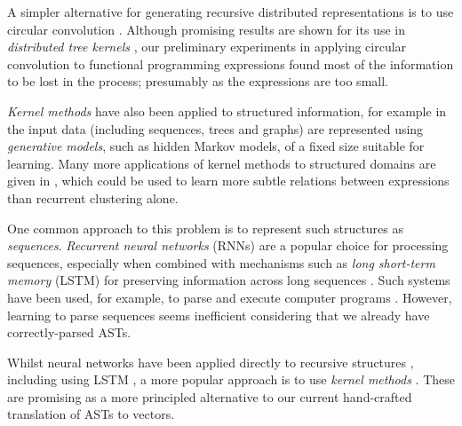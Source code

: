 A simpler alternative for generating recursive distributed representations is to
use circular convolution \cite{conf/ijcai/Plate91}. Although promising results
are shown for its use in \emph{distributed tree kernels}
\cite{zanzotto2012distributed}, our preliminary experiments in applying
circular convolution to functional programming expressions found most of the
information to be lost in the process; presumably as the expressions are too
small.

\emph{Kernel methods} have also been applied to structured information, for
example in \cite{Gartner2003} the input data (including sequences, trees and
graphs) are represented using \emph{generative models}, such as hidden Markov
models, of a fixed size suitable for learning. Many more applications of kernel
methods to structured domains are given in \cite{bakir2007predicting}, which
could be used to learn more subtle relations between expressions than recurrent
clustering alone.


 One common approach to this problem is
to represent such structures as \emph{sequences}. \emph{Recurrent neural
  networks} (RNNs) are a popular choice for processing sequences, especially
when combined with mechanisms such as \emph{long short-term memory} (LSTM) for
preserving information across long sequences \cite{hochreiter1997long}. Such
systems have been used, for example, to parse and execute computer programs
\cite{zaremba2014learning}. However, learning to parse sequences seems
inefficient considering that we already have correctly-parsed ASTs.

Whilst neural networks have been applied directly to recursive structures
\cite{goller1996learning}, including using LSTM \cite{zhu2015long}, a more
popular approach is to use \emph{kernel methods}
\cite{bakir2007predicting}. These are promising as a more principled alternative
to our current hand-crafted translation of ASTs to vectors.


